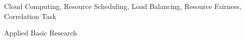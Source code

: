 \begin{ekeywords}
Cloud Computing, Resource Scheduling, Load Balancing, Resource Fairness, Correlation Task
\end{ekeywords}

\begin{ethesistype}
Applied Basic Research
\end{ethesistype}


